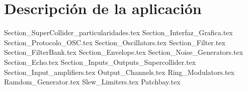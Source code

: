 \chapter{Descripción de la aplicación}


	{Section_SuperCollider_particularidades.tex}
	{Section_Interfaz_Grafica.tex}
	{Section_Protocolo_OSC.tex}
	{Section_Oscillators.tex}
	{Section_Filter.tex}	
	{Section_FilterBank.tex}	
	{Section_Envelope.tex}	
	{Section_Noise_Generators.tex}
	{Section_Echo.tex}
	{Section_Inputs_Outputs_Supercollider.tex}
	{Section_Input_amplifiers.tex}
	{Output_Channels.tex}
	{Ring_Modulators.tex}
	{Ramdom_Generator.tex}
	{Slew_Limiters.tex}
	{Patchbay.tex}